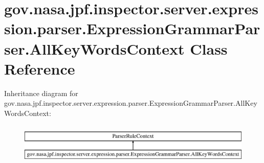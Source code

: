 \hypertarget{classgov_1_1nasa_1_1jpf_1_1inspector_1_1server_1_1expression_1_1parser_1_1_expression_grammar_parser_1_1_all_key_words_context}{}\section{gov.\+nasa.\+jpf.\+inspector.\+server.\+expression.\+parser.\+Expression\+Grammar\+Parser.\+All\+Key\+Words\+Context Class Reference}
\label{classgov_1_1nasa_1_1jpf_1_1inspector_1_1server_1_1expression_1_1parser_1_1_expression_grammar_parser_1_1_all_key_words_context}
Inheritance diagram for gov.\+nasa.\+jpf.\+inspector.\+server.\+expression.\+parser.\+Expression\+Grammar\+Parser.\+All\+Key\+Words\+Context\+:\begin{figure}[H]
\begin{center}
\leavevmode
\includegraphics[height=1.975309cm]{classgov_1_1nasa_1_1jpf_1_1inspector_1_1server_1_1expression_1_1parser_1_1_expression_grammar_parser_1_1_all_key_words_context}
\end{center}
\end{figure}

